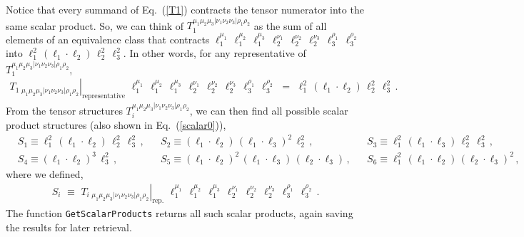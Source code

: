 \documentclass[aps,prd,preprint,eqsecnum,tightenlines,nofootinbib,showpacs]{revtex4}
\def\eqn#1{Eq.~({\ref{#1}})}
\begin{document}
Notice that every summand of \eqn{T1} contracts the tensor numerator into the 
same scalar product. So, we can think of 
$T_{1}^{\mu_{1}\mu_{2}\mu_{3}|\nu_{1}\nu_{2}\nu_{3}|\rho_{1}\rho_{2}}$ 
as the sum of all elements of an equivalence class that contracts 
$\ell_{1}^{\mu_{1}}\, \ell_{1}^{\mu_{2}}\, \ell_{1}^{\mu_{3}}\,
\ell_{2}^{\nu_{1}}\, \ell_{2}^{\nu_{2}}\, \ell_{2}^{\nu_{3}}\,
\ell_{3}^{\rho_{1}}\, \ell_{3}^{\rho_{2}}$
into $\ell_{1}^{2} \, (\ell_{1}\cdot\ell_{2}) \, \ell_{2}^{2} \, \ell_{3}^{2}$.
In other words, for any representative of 
$T_{1}^{\mu_{1}\mu_{2}\mu_{3}|\nu_{1}\nu_{2}\nu_{3}|\rho_{1}\rho_{2}}$,
%
\begin{align}
\left.T_{1\,\,\mu_{1}\mu_{2}\mu_{3}|\nu_{1}\nu_{2}\nu_{3}|\rho_{1}\rho_{2}}\right|_{\text{representative}}
\,\,
\ell_{1}^{\mu_{1}}\, \ell_{1}^{\mu_{2}}\, \ell_{1}^{\mu_{3}}\,
\ell_{2}^{\nu_{1}}\, \ell_{2}^{\nu_{2}}\, \ell_{2}^{\nu_{3}}\,
\ell_{3}^{\rho_{1}}\, \ell_{3}^{\rho_{2}}
\,\,=\,\,
\ell_{1}^{2} \, (\ell_{1}\cdot\ell_{2}) \, \ell_{2}^{2} \, \ell_{3}^{2}\,.
\end{align}
%
From the tensor structures $T_{i}^{\mu_{1}\mu_{2}\mu_{3}|\nu_{1}\nu_{2}\nu_{3}|\rho_{1}\rho_{2}}$,
we can then find all possible scalar product structures (also shown in \eqn{scalar0}),
\begin{align}
&S_{1}\equiv\ell_{1}^{2} \, (\ell_{1}\cdot\ell_{2}) \, \ell_{2}^{2} \, \ell_{3}^{2} \,,
&&S_{2}\equiv(\ell_{1}\cdot\ell_{2}) \, (\ell_{1}\cdot\ell_{3})^{2} \, \ell_{2}^{2} \,,
&&S_{3}\equiv\ell_{1}^{2}\, (\ell_{1}\cdot\ell_{3})\, \ell_{2}^{2}\, \ell_{3}^{2} \,,
\nonumber\\[.2cm]
&S_{4}\equiv(\ell_{1}\cdot\ell_{2})^{3}\, \ell_{3}^{2} \,,
&&S_{5}\equiv(\ell_{1}\cdot\ell_{2})^{2}\, (\ell_{1}\cdot\ell_{3})\, (\ell_{2}\cdot\ell_{3}) \,,
&&S_{6}\equiv\ell_{1}^{2}\, (\ell_{1}\cdot\ell_{2})\, (\ell_{2}\cdot\ell_{3})^{2} \,,
\label{scalar}
\end{align}
where we defined,
%
\begin{align}
S_{i}
\,\,\equiv\,\,
\left.T_{i\,\,\mu_{1}\mu_{2}\mu_{3}|\nu_{1}\nu_{2}\nu_{3}|\rho_{1}\rho_{2}}\right|_{\text{rep.}}
\,\,
\ell_{1}^{\mu_{1}}\, \ell_{1}^{\mu_{2}}\, \ell_{1}^{\mu_{3}}\,
\ell_{2}^{\nu_{1}}\, \ell_{2}^{\nu_{2}}\, \ell_{2}^{\nu_{3}}\,
\ell_{3}^{\rho_{1}}\, \ell_{3}^{\rho_{2}}
\,.
\label{TS}
\end{align}
%
The function
\texttt{GetScalarProducts} returns all such scalar products, again saving the results for later retrieval.
\end{document}
